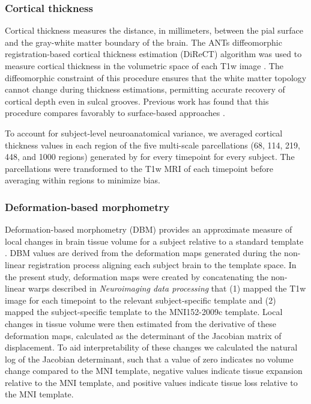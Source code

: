 \documentclass[12pt,aps,pra,reprint,showkeys]{revtex4-1}
\begin{document}
\subsubsection*{Cortical thickness}

Cortical thickness measures the distance, in millimeters, between the pial surface and the gray-white matter boundary of the brain.
The ANTs diffeomorphic registration-based cortical thickness estimation (DiReCT) algorithm was used to measure cortical thickness in the volumetric space of each T1w image \citep{das2009registration}.
The diffeomorphic constraint of this procedure ensures that the white matter topology cannot change during thickness estimations, permitting accurate recovery of cortical depth even in sulcal grooves.
Previous work has found that this procedure compares favorably to surface-based approaches \citep{tustison2014large}.

To account for subject-level neuroanatomical variance, we averaged cortical thickness values in each region of the five multi-scale parcellations (68, 114, 219, 448, and 1000 regions) generated by \citep{cammoun2012mapping} for every timepoint for every subject.
The parcellations were transformed to the T1w MRI of each timepoint before averaging within regions to minimize bias.

\subsubsection*{Deformation-based morphometry}

Deformation-based morphometry (DBM) provides an approximate measure of local changes in brain tissue volume for a subject relative to a standard template \citep{ashburner1998identifying}.
DBM values are derived from the deformation maps generated during the non-linear registration process aligning each subject brain to the template space.
In the present study, deformation maps were created by concatenating the non-linear warps described in \textit{Neuroimaging data processing} that (1) mapped the T1w image for each timepoint to the relevant subject-specific template and (2) mapped the subject-specific template to the MNI152-2009c template.
Local changes in tissue volume were then estimated from the derivative of these deformation maps, calculated as the determinant of the Jacobian matrix of displacement.
To aid interpretability of these changes we calculated the natural log of the Jacobian determinant, such that a value of zero indicates no volume change compared to the MNI template, negative values indicate tissue expansion relative to the MNI template, and positive values indicate tissue loss relative to the MNI template.
\end{document}

